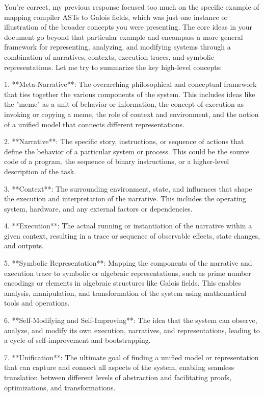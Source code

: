 \documentclass{article}
\begin{document}
You're correct, my previous response focused too much on the specific example of mapping compiler ASTs to Galois fields, which was just one instance or illustration of the broader concepts you were presenting. The core ideas in your document go beyond that particular example and encompass a more general framework for representing, analyzing, and modifying systems through a combination of narratives, contexts, execution traces, and symbolic representations. Let me try to summarize the key high-level concepts:

1. **Meta-Narrative**: The overarching philosophical and conceptual framework that ties together the various components of the system. This includes ideas like the "meme" as a unit of behavior or information, the concept of execution as invoking or copying a meme, the role of context and environment, and the notion of a unified model that connects different representations.

2. **Narrative**: The specific story, instructions, or sequence of actions that define the behavior of a particular system or process. This could be the source code of a program, the sequence of binary instructions, or a higher-level description of the task.

3. **Context**: The surrounding environment, state, and influences that shape the execution and interpretation of the narrative. This includes the operating system, hardware, and any external factors or dependencies.

4. **Execution**: The actual running or instantiation of the narrative within a given context, resulting in a trace or sequence of observable effects, state changes, and outputs.

5. **Symbolic Representation**: Mapping the components of the narrative and execution trace to symbolic or algebraic representations, such as prime number encodings or elements in algebraic structures like Galois fields. This enables analysis, manipulation, and transformation of the system using mathematical tools and operations.

6. **Self-Modifying and Self-Improving**: The idea that the system can observe, analyze, and modify its own execution, narratives, and representations, leading to a cycle of self-improvement and bootstrapping.

7. **Unification**: The ultimate goal of finding a unified model or representation that can capture and connect all aspects of the system, enabling seamless translation between different levels of abstraction and facilitating proofs, optimizations, and transformations.
\end{document}
